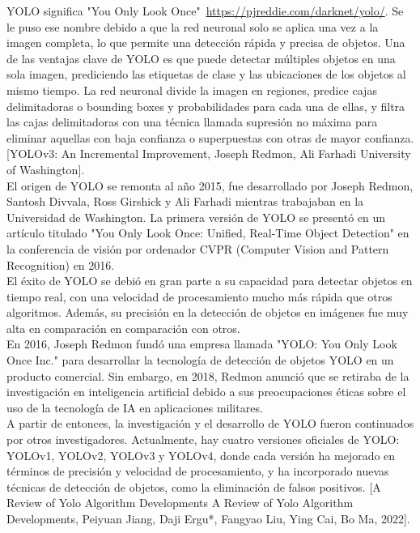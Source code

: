 YOLO significa "You Only Look Once"\  \url{https://pjreddie.com/darknet/yolo/}. Se le puso ese nombre debido a que la red neuronal solo se aplica una vez a la imagen completa, lo que permite una detección rápida y precisa de objetos. Una de las ventajas clave de YOLO es que puede detectar múltiples objetos en una sola imagen, prediciendo las etiquetas de clase y las ubicaciones de los objetos al mismo tiempo. La red neuronal divide la imagen en regiones, predice cajas delimitadoras o bounding boxes y probabilidades para cada una de ellas, y filtra las cajas delimitadoras con una técnica llamada supresión no máxima para eliminar aquellas con baja confianza o superpuestas con otras de mayor confianza. [YOLOv3: An Incremental Improvement, Joseph Redmon, Ali Farhadi University of Washington].\\

El origen de YOLO se remonta al año 2015, fue desarrollado por Joseph Redmon, Santosh Divvala, Ross Girshick y Ali Farhadi mientras trabajaban en la Universidad de Washington. La primera versión de YOLO se presentó en un artículo titulado "You Only Look Once: Unified, Real-Time Object Detection" en la conferencia de visión por ordenador CVPR (Computer Vision and Pattern Recognition) en 2016. \\

El éxito de YOLO se debió en gran parte a su capacidad para detectar objetos en tiempo real, con una velocidad de procesamiento mucho más rápida que otros algoritmos. Además, su precisión en la detección de objetos en imágenes fue muy alta en comparación en comparación con otros.\\

En 2016, Joseph Redmon fundó una empresa llamada "YOLO: You Only Look Once Inc." para desarrollar la tecnología de detección de objetos YOLO en un producto comercial. Sin embargo, en 2018, Redmon anunció que se retiraba de la investigación en inteligencia artificial debido a sus preocupaciones éticas sobre el uso de la tecnología de IA en aplicaciones militares.\\

A partir de entonces, la investigación y el desarrollo de YOLO fueron continuados por otros investigadores. Actualmente, hay cuatro versiones oficiales de YOLO: YOLOv1, YOLOv2, YOLOv3 y YOLOv4, donde cada versión ha mejorado en términos de precisión y velocidad de procesamiento, y ha incorporado nuevas técnicas de detección de objetos, como la eliminación de falsos positivos. [A Review of Yolo Algorithm Developments A Review of Yolo Algorithm Developments, Peiyuan Jiang, Daji Ergu*, Fangyao Liu, Ying Cai, Bo Ma, 2022].\\

